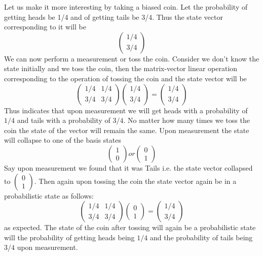 \documentclass[12pt, oneside]{book}
\theoremstyle{definition}
\theoremstyle{definition}
\theoremstyle{remark}
\begin{document}
Let us make it more interesting by taking a biased coin. Let the probability of getting heads be 1/4 and of getting tails be 3/4. Thus the state vector corresponding to it will be
\[
\begin{pmatrix} 1/4 \\ 3/4 \end{pmatrix}
\]
We can now perform a measurement or toss the coin. Consider we don't know the state initially and we toss the coin, then the matrix-vector linear operation corresponding to the operation of tossing the coin and the state vector will be
\[
\begin{pmatrix} 1/4 & 1/4 \\ 3/4 & 3/4 \end{pmatrix}\begin{pmatrix} 1/4 \\ 3/4 \end{pmatrix} = \begin{pmatrix} 1/4 \\ 3/4 \end{pmatrix}
\]
Thus indicates that upon measurement we will get heads with a probability of $1/4$ and tails with a probability of $3/4$. No matter how many times we toss the coin the state of the vector will remain the same. Upon measurement the state will collapse to one of the basis states
\[
\begin{pmatrix} 1 \\ 0 \end{pmatrix} or \begin{pmatrix} 0 \\1 \end{pmatrix}
\]
Say upon measurement we found that it was Tails i.e. the state vector collapsed to $\begin{pmatrix} 0 \\1\end{pmatrix}$. Then again upon tossing the coin the state vector again be in a probabilistic state as follows:
\[
\begin{pmatrix} 1/4 & 1/4 \\3/4 & 3/4 \end{pmatrix} \begin{pmatrix} 0 \\ 1 \end{pmatrix} = \begin{pmatrix} 1/4 \\ 3/4\end{pmatrix}
\]
as expected. The state of the coin after tossing will again be a probabilistic state will the probability of getting heads being $1/4$ and the probability of tails being $3/4$ upon measurement.
\end{document}
